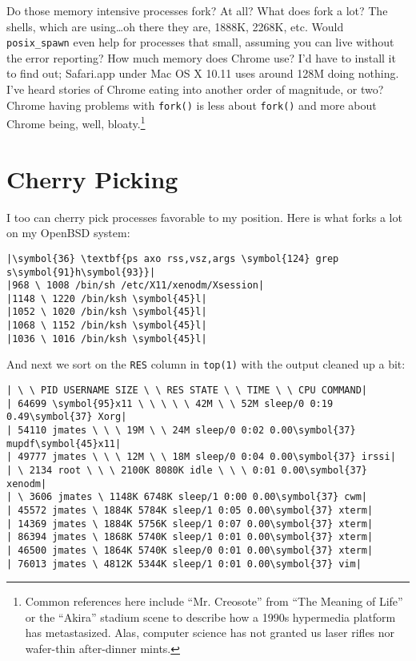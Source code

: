 \documentclass[10pt,a4paper]{article}
\begin{document}
Do those memory intensive processes fork? At all? What does fork a lot?
The shells, which are using\ldots oh there they are, 1888K, 2268K, etc.
Would \texttt{posix\_spawn} even help for processes that small, assuming
you can live without the error reporting? How much memory does Chrome
use? I'd have to install it to find out; Safari.app under Mac OS X 10.11
uses around 128M doing nothing. I've heard stories of Chrome eating into
another order of magnitude, or two? Chrome having problems with
\texttt{fork()} is less about \texttt{fork()} and more about Chrome
being, well, bloaty.\footnote{Common references here include ``Mr.
Creosote'' from ``The Meaning of Life'' or the ``Akira'' stadium scene
to describe how a 1990s hypermedia platform has metastasized. Alas,
computer science has not granted us laser rifles nor wafer-thin
after-dinner mints.}

\section*{Cherry Picking}

I too can cherry pick processes favorable to my position. Here is what
forks a lot on my OpenBSD system:

\begin{lstlisting}
|\symbol{36} \textbf{ps axo rss,vsz,args \symbol{124} grep s\symbol{91}h\symbol{93}}|
|968 \ 1008 /bin/sh /etc/X11/xenodm/Xsession|
|1148 \ 1220 /bin/ksh \symbol{45}l|
|1052 \ 1020 /bin/ksh \symbol{45}l|
|1068 \ 1152 /bin/ksh \symbol{45}l|
|1036 \ 1016 /bin/ksh \symbol{45}l|
\end{lstlisting}

And next we sort on the \texttt{RES} column in \texttt{top(1)} with the
output cleaned up a bit:

\begin{lstlisting}
| \ \ PID USERNAME SIZE \ \ RES STATE \ \ TIME \ \ CPU COMMAND|
| 64699 \symbol{95}x11 \ \ \ \ \ 42M \ \ 52M sleep/0 0:19 0.49\symbol{37} Xorg|
| 54110 jmates \ \ \ 19M \ \ 24M sleep/0 0:02 0.00\symbol{37} mupdf\symbol{45}x11|
| 49777 jmates \ \ \ 12M \ \ 18M sleep/0 0:04 0.00\symbol{37} irssi|
| \ 2134 root \ \ \ 2100K 8080K idle \ \ \ 0:01 0.00\symbol{37} xenodm|
| \ 3606 jmates \ 1148K 6748K sleep/1 0:00 0.00\symbol{37} cwm|
| 45572 jmates \ 1884K 5784K sleep/1 0:05 0.00\symbol{37} xterm|
| 14369 jmates \ 1884K 5756K sleep/1 0:07 0.00\symbol{37} xterm|
| 86394 jmates \ 1868K 5740K sleep/1 0:01 0.00\symbol{37} xterm|
| 46500 jmates \ 1864K 5740K sleep/0 0:01 0.00\symbol{37} xterm|
| 76013 jmates \ 4812K 5344K sleep/1 0:01 0.00\symbol{37} vim|
\end{lstlisting}
\end{document}
